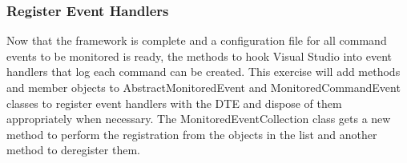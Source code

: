 \newpage



\subsubsection{Register Event Handlers}

Now that the framework is complete and a configuration file for all command events to be monitored is ready, the methods to hook Visual Studio into event handlers that log each command can be created.  This exercise will add methods and member objects to AbstractMonitoredEvent and MonitoredCommandEvent classes to register event handlers with the DTE and dispose of them appropriately when necessary.  The MonitoredEventCollection class gets a new method to perform the registration from the objects in the list and another method to deregister them.


